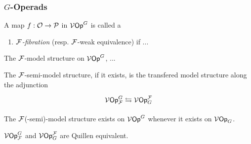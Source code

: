 \documentclass[a4paper,10pt]{article}%
\begin{document}



















\subsubsection{$G$-Operads}
\begin{definition}
  A map $f: \mathcal{O} \to \mathcal{P}$ in $\mathcal V\mathsf{Op}^G$ is called a 
  \begin{enumerate}
  \item \textit{$\mathcal F$-fibration} (resp. $\mathcal F$-weak equivalence) if ...
  \end{enumerate}
\end{definition}
\begin{definition}
  The $\mathcal F$-model structure on $\mathcal V\mathsf{Op}^G$, ...
\end{definition}

\begin{lemma}
  The $\mathcal F$-semi-model structure, if it exists, is the transfered model structure along the adjunction
\[
\begin{tikzcd}
  \V\Op^G_\F \leftrightarrows \V\Op_G^\F
\end{tikzcd}
\]
\end{lemma}
\begin{corollary}
  The $\mathcal F$(-semi)-model structure exists on $\mathcal V\mathsf{Op}^G$ whenever it exists on $\mathcal V\mathsf{Op}_G$.
\end{corollary}
\begin{theorem}
  $\mathcal V\mathsf{Op}^G_{\mathcal F}$ and $\mathcal V\mathsf{Op}_G^{\mathcal F}$ are Quillen equivalent.
\end{theorem}
\end{document}
